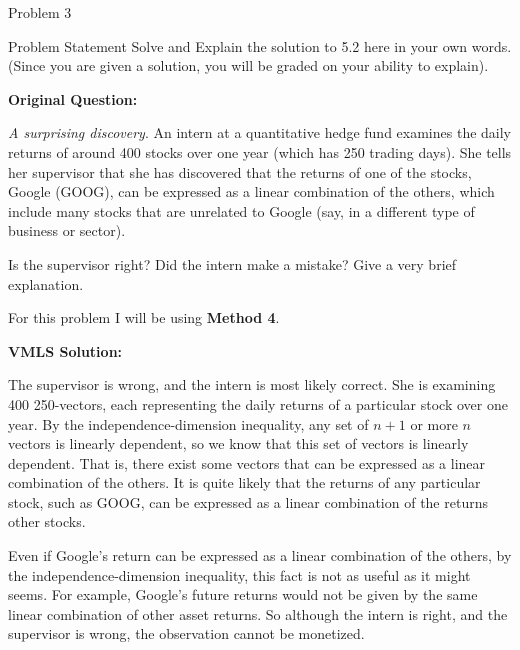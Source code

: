 \begin{problem}{Problem 3}
    \begin{statement}{Problem Statement}
        Solve and Explain the solution to 5.2 here in your own words. (Since you are given a solution, you will be graded on your ability to explain). \vspace*{1em}

        \textbf{Original Question:} \vspace*{1em}

        \textit{A surprising discovery}. An intern at a quantitative hedge fund examines the daily returns of around 400 stocks over one year (which has 250 trading days). She tells her supervisor that 
        she has discovered that the returns of one of the stocks, Google (GOOG), can be expressed as a linear combination of the others, which include many stocks that are unrelated to Google (say, in a 
        different type of business or sector).

        Is the supervisor right? Did the intern make a mistake? Give a very brief explanation.
    \end{statement}

    \begin{Highlight}[Solution]
        For this problem I will be using \textbf{Method 4}. \vspace*{1em}

        \textbf{VMLS Solution:} \vspace*{1em}

        The supervisor is wrong, and the intern is most likely correct. She is examining 400 250-vectors, each representing the daily returns of a particular stock over one year. By the independence-dimension 
        inequality, any set of $n + 1$ or more $n$ vectors is linearly dependent, so we know that this set of vectors is linearly dependent. That is, there exist some vectors that can be expressed as a linear 
        combination of the others. It is quite likely that the returns of any particular stock, such as GOOG, can be expressed as a linear combination of the returns other stocks.

        Even if Google’s return can be expressed as a linear combination of the others, by the independence-dimension inequality, this fact is not as useful as it might seems. For example, Google’s future returns 
        would not be given by the same linear combination of other asset returns. So although the intern is right, and the supervisor is wrong, the observation cannot be monetized. \vspace*{1em}


\end{Highlight}
\end{problem}
